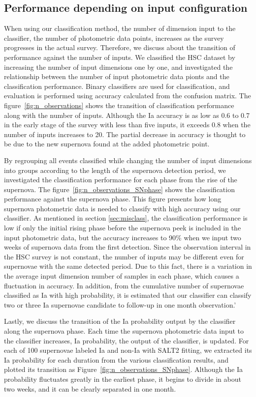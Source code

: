 \documentclass[useamsfonts]{pasj01}
\begin{document}
\subsection{Performance depending on input configuration}
%
When using our classification method, the number of dimension input to the classifier, the number of photometric data points, increases as the survey progresses in the actual survey.
Therefore, we discuss about the transition of performance against the number of inputs.
We classified the HSC dataset by increasing the number of input dimensions one by one, and investigated the relationship between the number of input photometric data pionts and the classification performance.
Binary classifiers are used for classification, and evaluation is performed using accuracy calculated from the confusion matrix.
The figure\ \ref{fig:n_observations} shows the transition of classification performance along with the number of inputs.
Although the Ia accuracy is as low as 0.6 to 0.7 in the early stage of the survey with less than five inputs, it exceeds 0.8 when the number of inputs increases to 20.
The partial decrease in accuracy is thought to be due to the new supernova found at the added photometric point.

By regrouping all events classified while changing the number of input dimensions into groups according to the length of the supernova detection period, we investigated the classification performance for each phase from the rise of the supernova.
The figure\ \ref{fig:n_observations_SNphase} shows the classification performance against the supernova phase.
This figure presents how long supernova photometric data is needed to classify with high accuracy using our classifier.
As mentioned in section \ref{sec:misclass}, the classification performance is low if only the initial rising phase before the supernova peek is included in the input photometric data, but the accuracy increases to 90\% when we input two weeks of supernova data from the first detection.
Since the observation interval in the HSC survey is not constant, the number of inputs may be different even for supernovae with the same detected period.
Due to this fact, there is a variation in the average input dimension number of samples in each phase, which causes a fluctuation in accuracy.
In addition, from the cumulative number of supernovae classified as Ia with high probability,  it is estimated that our classifier can classify two or three Ia supernovae candidate to follow-up in one month observation.'

Lastly, we discuss the transition of the Ia probability output by the classifier along the supernova phase.
Each time the supernova photometric data input to the classifier increases, Ia probability, the output of the classifier, is updated.
For each of 100 supernovae labeled Ia and non-Ia with SALT2 fitting, we extracted its Ia probability for each duration from the various classification results, and plotted its transition as Figure\ \ref{fig:n_observations_SNphase}.
Although the Ia probability fluctuates greatly in the earliest phase, it begins to divide in about two weeks, and it can be clearly separated in one month.
\end{document}
